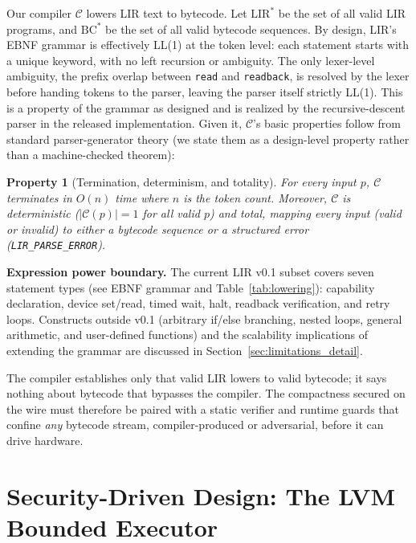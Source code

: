 \documentclass[a4paper,fleqn,longmktitle]{cas-dc}
\newtheorem{property}{Property}
\begin{document}
Our compiler $\mathcal{C}$ lowers LIR text to bytecode. Let $\text{LIR}^*$ be the set of all valid LIR programs, and $\text{BC}^*$ be the set of all valid bytecode sequences. By design, LIR's EBNF grammar is effectively LL(1) at the token level: each statement starts with a unique keyword, with no left recursion or ambiguity. The only lexer-level ambiguity, the prefix overlap between \texttt{read} and \texttt{readback}, is resolved by the lexer before handing tokens to the parser, leaving the parser itself strictly LL(1). This is a property of the grammar as designed and is realized by the recursive-descent parser in the released implementation. Given it, $\mathcal{C}$'s basic properties follow from standard parser-generator theory (we state them as a design-level property rather than a machine-checked theorem):

\begin{property}[Termination, determinism, and totality]
For every input $p$, $\mathcal{C}$ terminates in $O(n)$ time where $n$ is the token count. Moreover, $\mathcal{C}$ is deterministic ($|\mathcal{C}(p)| = 1$ for all valid $p$) and total, mapping every input (valid or invalid) to either a bytecode sequence or a structured error (\texttt{LIR\_PARSE\_ERROR}).
\end{property}

\textbf{Expression power boundary.}
\label{par:expr_boundary}
The current LIR v0.1 subset covers seven statement types (see EBNF grammar and Table~\ref{tab:lowering}): capability declaration, device set/read, timed wait, halt, readback verification, and retry loops. Constructs outside v0.1 (arbitrary if/else branching, nested loops, general arithmetic, and user-defined functions) and the scalability implications of extending the grammar are discussed in Section~\ref{sec:limitations_detail}.

The compiler establishes only that valid LIR lowers to valid bytecode; it says nothing about bytecode that bypasses the compiler. The compactness secured on the wire must therefore be paired with a static verifier and runtime guards that confine \emph{any} bytecode stream, compiler-produced or adversarial, before it can drive hardware.

\section{Security-Driven Design: The LVM Bounded Executor}
\label{sec:mvm}
\end{document}
